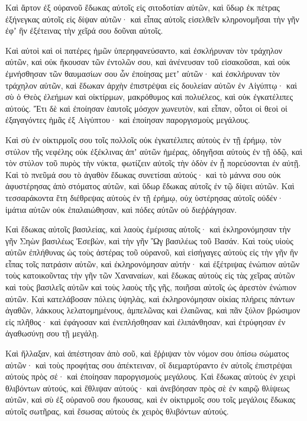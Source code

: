 {Καὶ ἄρτον ἐξ οὐρανοῦ ἔδωκας αὐτοῖς εἰς σιτοδοτίαν αὐτῶν, καὶ ὕδωρ ἐκ πέτρας ἐξήνεγκας αὐτοῖς εἰς δίψαν αὐτῶν· καὶ εἶπας αὐτοῖς εἰσελθεῖν κληρονομῆσαι τὴν γῆν ἐφʼ ἣν ἐξέτεινας τὴν χεῖρά σου δοῦναι αὐτοῖς.
\par }{\PP {}Καὶ αὐτοὶ καὶ οἱ πατέρες ἡμῶν ὑπερηφανεύσαντο, καὶ ἐσκλήρυναν τὸν τράχηλον αὐτῶν, καὶ οὐκ ἤκουσαν τῶν ἐντολῶν σου,
καὶ ἀνένευσαν τοῦ εἰσακοῦσαι, καὶ οὐκ ἐμνήσθησαν τῶν θαυμασίων σου ὧν ἐποίησας μετʼ αὐτῶν· καὶ ἐσκλήρυναν τὸν τράχηλον αὐτῶν, καὶ ἔδωκαν ἀρχὴν ἐπιστρέψαι εἰς δουλείαν αὐτῶν ἐν Αἰγύπτῳ· καὶ σὺ ὁ Θεὸς ἐλεήμων καὶ οἰκτίρμων, μακρόθυμος καὶ πολυέλεος, καὶ οὐκ ἐγκατέλιπες αὐτούς.
Ἔτι δὲ καὶ ἐποίησαν ἑαυτοῖς μόσχον χωνευτὸν, καὶ εἶπαν, οὗτοι οἱ θεοὶ οἱ ἐξαγαγόντες ἡμᾶς ἐξ Αἰγύπτου· καὶ ἐποίησαν παροργισμοὺς μεγάλους.
\par }{\PP {}Καὶ σὺ ἐν οἰκτιρμοῖς σου τοῖς πολλοῖς οὐκ ἐγκατέλιπες αὐτοὺς ἐν τῇ ἐρήμῳ, τὸν στύλον τῆς νεφέλης οὐκ ἐξέκλινας ἀπʼ αὐτῶν ἡμέρας, ὁδηγῆσαι αὐτοὺς ἐν τῇ ὁδῷ, καὶ τὸν στύλον τοῦ πυρὸς τὴν νύκτα, φωτίζειν αὐτοῖς τὴν ὁδὸν ἐν ᾗ πορεύσονται ἐν αὐτῇ.
Καὶ τὸ πνεῦμά σου τὸ ἀγαθὸν ἔδωκας συνετίσαι αὐτούς· καὶ τὸ μάννα σου οὐκ ἀφυστέρησας ἀπὸ στόματος αὐτῶν, καὶ ὕδωρ ἔδωκας αὐτοῖς ἐν τῷ δίψει αὐτῶν.
Καὶ τεσσαράκοντα ἔτη διέθρεψας αὐτοὺς ἐν τῇ ἐρήμῳ, οὐχ ὑστέρησας αὐτοῖς οὐδέν· ἱμάτια αὐτῶν οὐκ ἐπαλαιώθησαν, καὶ πόδες αὐτῶν οὐ διεῤῥάγησαν.
\par }{\PP {}Καὶ ἔδωκας αὐτοῖς βασιλείας, καὶ λαοὺς ἐμέρισας αὐτοῖς· καὶ ἐκληρονόμησαν τὴν γῆν Σηὼν βασιλέως Ἐσεβὼν, καὶ τὴν γῆν Ὢγ βασιλέως τοῦ Βασάν.
Καὶ τοὺς υἱοὺς αὐτῶν ἐπλήθυνας ὡς τοὺς ἀστέρας τοῦ οὐρανοῦ, καὶ εἰσήγαγες αὐτοὺς εἰς τὴν γῆν ἣν εἶπας τοῖς πατράσιν αὐτῶν, καὶ ἐκληρονόμησαν αὐτήν·
καὶ ἐξέτριψας ἐνώπιον αὐτῶν τοὺς κατοικοῦντας τὴν γῆν τῶν Χαναναίων, καὶ ἔδωκας αὐτοὺς εἰς τὰς χεῖρας αὐτῶν καὶ τοὺς βασιλεῖς αὐτῶν καὶ τοὺς λαοὺς τῆς γῆς, ποιῆσαι αὐτοῖς ὡς ἀρεστὸν ἐνώπιον αὐτῶν.
Καὶ κατελάβοσαν πόλεις ὑψηλὰς, καὶ ἐκληρονόμησαν οἰκίας πλήρεις πάντων ἀγαθῶν, λάκκους λελατομημένους, ἀμπελῶνας καὶ ἐλαιῶνας, καὶ πᾶν ξύλον βρώσιμον εἰς πλῆθος· καὶ ἐφάγοσαν καὶ ἐνεπλήσθησαν καὶ ἐλιπάνθησαν, καὶ ἐτρύφησαν ἐν ἀγαθωσύνῃ σου τῇ μεγάλῃ.
\par }{\PP {}Καὶ ἤλλαξαν, καὶ ἀπέστησαν ἀπὸ σοῦ, καὶ ἔῤῥιψαν τὸν νόμον σου ὀπίσω σώματος αὐτῶν· καὶ τοὺς προφήτας σου ἀπέκτειναν, οἳ διεμαρτύραντο ἐν αὐτοῖς ἐπιστρέψαι αὐτοὺς πρὸς σέ· καὶ ἐποίησαν παροργισμοὺς μεγάλους.
Καὶ ἔδωκας αὐτοὺς ἐν χειρὶ θλιβόντων αὐτούς, καὶ ἔθλιψαν αὐτούς· καὶ ἀνεβόησαν πρὸς σὲ ἐν καιρῷ θλίψεως αὐτῶν, καὶ σὺ ἐξ οὐρανοῦ σου ἤκουσας, καὶ ἐν οἰκτιρμοῖς σου τοῖς μεγάλοις ἔδωκας αὐτοῖς σωτῆρας, καὶ ἔσωσας αὐτοὺς ἐκ χειρὸς θλιβόντων αὐτούς.
}
